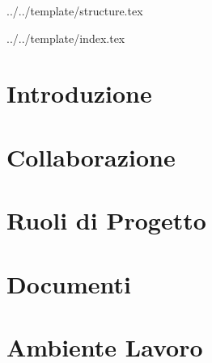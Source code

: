 


\def\DOCUMENTO{Norme di Progetto}
\def\VERSIONE{1.0.0}

\def\DESCRIZIONE{Documento contenente l’insieme di norme stabilite dal gruppo \GRUPPO per la realizzazione di \PROGETTO.}

\def\REDATTORE {Bogdan Suierica \\ & Emanuele Crespan}
\def\VERIFICATORE {Matteo Agostinetto}
\def\RESPONSABILE {Valerio Burlin}

\def\USO {Interno}

\def\DISTRIBUZIONE {\GRUPPO{}\\ & \COMMITTENTE{}\\}

\def\DESCRIZIONE {Documento contenente l'insieme di norme stabilite dal gruppo \GRUPPO\ per la realizzazione di \PROGETTO.}


\def\INDICE	{true}
\def\TABELLE {true}
\def\FIGURE {true}


 {../../template/structure.tex}


 {../../template/index.tex}



\section{Introduzione}

\newpage
\section{Collaborazione}

\newpage
\section{Ruoli di Progetto}

\newpage
\section{Documenti}

\newpage
\section{Ambiente Lavoro}


